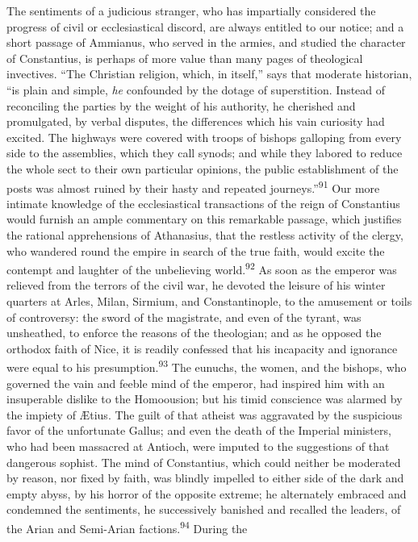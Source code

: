 The sentiments of a judicious stranger, who has impartially
considered the progress of civil or ecclesiastical discord, are
always entitled to our notice; and a short passage of Ammianus,
who served in the armies, and studied the character of
Constantius, is perhaps of more value than many pages of
theological invectives. “The Christian religion, which, in
itself,” says that moderate historian, “is plain and simple, \textit{he}
confounded by the dotage of superstition. Instead of reconciling
the parties by the weight of his authority, he cherished and
promulgated, by verbal disputes, the differences which his vain
curiosity had excited. The highways were covered with troops of
bishops galloping from every side to the assemblies, which they
call synods; and while they labored to reduce the whole sect to
their own particular opinions, the public establishment of the
posts was almost ruined by their hasty and repeated journeys.”\textsuperscript{91}
Our more intimate knowledge of the ecclesiastical transactions of
the reign of Constantius would furnish an ample commentary on
this remarkable passage, which justifies the rational
apprehensions of Athanasius, that the restless activity of the
clergy, who wandered round the empire in search of the true
faith, would excite the contempt and laughter of the unbelieving
world.\textsuperscript{92} As soon as the emperor was relieved from the terrors of
the civil war, he devoted the leisure of his winter quarters at
Arles, Milan, Sirmium, and Constantinople, to the amusement or
toils of controversy: the sword of the magistrate, and even of
the tyrant, was unsheathed, to enforce the reasons of the
theologian; and as he opposed the orthodox faith of Nice, it is
readily confessed that his incapacity and ignorance were equal to
his presumption.\textsuperscript{93} The eunuchs, the women, and the bishops, who
governed the vain and feeble mind of the emperor, had inspired
him with an insuperable dislike to the Homoousion; but his timid
conscience was alarmed by the impiety of Ætius. The guilt of that
atheist was aggravated by the suspicious favor of the unfortunate
Gallus; and even the death of the Imperial ministers, who had
been massacred at Antioch, were imputed to the suggestions of
that dangerous sophist. The mind of Constantius, which could
neither be moderated by reason, nor fixed by faith, was blindly
impelled to either side of the dark and empty abyss, by his
horror of the opposite extreme; he alternately embraced and
condemned the sentiments, he successively banished and recalled
the leaders, of the Arian and Semi-Arian factions.\textsuperscript{94} During the
